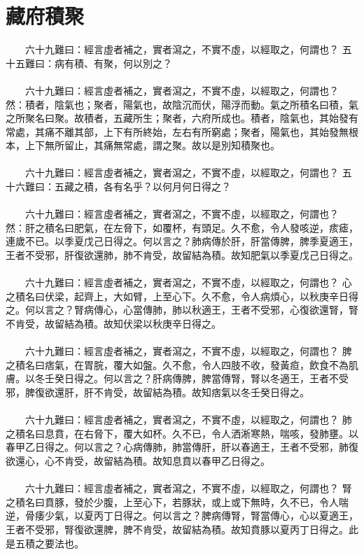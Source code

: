 \section{藏府積聚}

　　六十九難曰：經言虛者補之，實者瀉之，不實不虛，以經取之，何謂也？
五十五難曰：病有積、有聚，何以別之？
\\\\
　　六十九難曰：經言虛者補之，實者瀉之，不實不虛，以經取之，何謂也？
然：積者，陰氣也；聚者，陽氣也，故陰沉而伏，陽浮而動。氣之所積名曰積，氣之所聚名曰聚。故積者，五藏所生；聚者，六府所成也。積者，陰氣也，其始發有常處，其痛不離其部，上下有所終始，左右有所窮處；聚者，陽氣也，其始發無根本，上下無所留止，其痛無常處，謂之聚。故以是別知積聚也。
\\\\
　　六十九難曰：經言虛者補之，實者瀉之，不實不虛，以經取之，何謂也？
五十六難曰：五藏之積，各有名乎？以何月何日得之？
\\\\
　　六十九難曰：經言虛者補之，實者瀉之，不實不虛，以經取之，何謂也？
然：肝之積名曰肥氣，在左脅下，如覆杯，有頭足。久不愈，令人發咳逆，痎瘧，連歲不已。以季夏戊己日得之。何以言之？肺病傳於肝，肝當傳脾，脾季夏適王，王者不受邪，肝復欲還肺，肺不肯受，故留結為積。故知肥氣以季夏戊己日得之。
\\\\
　　六十九難曰：經言虛者補之，實者瀉之，不實不虛，以經取之，何謂也？
心之積名曰伏梁，起齊上，大如臂，上至心下。久不愈，令人病煩心，以秋庚辛日得之。何以言之？腎病傳心，心當傳肺，肺以秋適王，王者不受邪，心復欲還腎，腎不肯受，故留結為積。故知伏梁以秋庚辛日得之。
\\\\
　　六十九難曰：經言虛者補之，實者瀉之，不實不虛，以經取之，何謂也？
脾之積名曰痞氣，在胃脘，覆大如盤。久不愈，令人四肢不收，發黃疸，飲食不為肌膚。以冬壬癸日得之。何以言之？肝病傳脾，脾當傳腎，腎以冬適王，王者不受邪，脾復欲還肝，肝不肯受，故留結為積。故知痞氣以冬壬癸日得之。
\\\\
　　六十九難曰：經言虛者補之，實者瀉之，不實不虛，以經取之，何謂也？
肺之積名曰息賁，在右脅下，覆大如杯。久不已，令人洒淅寒熱，喘咳，發肺壅。以春甲乙日得之。何以言之？心病傳肺，肺當傳肝，肝以春適王，王者不受邪，肺復欲還心，心不肯受，故留結為積。故知息賁以春甲乙日得之。
\\\\
　　六十九難曰：經言虛者補之，實者瀉之，不實不虛，以經取之，何謂也？
腎之積名曰賁豚，發於少腹，上至心下，若豚狀，或上或下無時，久不已，令人喘逆，骨痿少氣，以夏丙丁日得之。何以言之？脾病傳腎，腎當傳心，心以夏適王，王者不受邪，腎復欲還脾，脾不肯受，故留結為積。故知賁豚以夏丙丁日得之。此是五積之要法也。